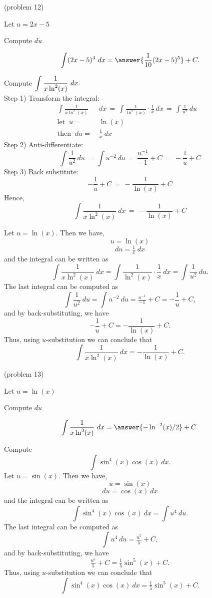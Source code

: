 \documentclass[handout]{ximera}
\begin{document}
\begin{problem}(problem 12)
\begin{hint}
Let $u = 2x - 5$
\end{hint}
\begin{hint}
Compute $du$
\end{hint}
\[\int (2x - 5)^4 \ dx = \answer{\frac{1}{10}(2x-5)^5} +C.\]
\end{problem}


\begin{example}[example 13]
 Compute $\dis \int \frac{1}{x\ln^2(x)} \ dx.$\\
Step 1) Transform the integral:
\begin{align*}
\int \frac{1}{x\ln^2(x)}& \ dx \, = \, \int \frac{1}{\ln^2(x)} \cdot \frac{1}{x} \, dx\,  = \, \int \frac{1}{u^2} \ du\\
\text{let} \;\; u = & \ \ln(x)&  \\
\text{then} \;\; du = & \ \frac{1}{x} \ dx&
\end{align*}
Step 2) Anti-differentiate:
\[
\int \frac{1}{u^2} \, du \, = \, \int u^{-2} \, du\, =\, \frac{u^{-1}}{-1} + C\, =\, -\frac{1}{u} + C
\]
Step 3) Back substitute:
\[
-\frac{1}{u} + C \, =\, -\frac{1}{\ln(x)} + C
\]
Hence,
\[
\int \frac{1}{x\ln^2(x)} \ dx \,= \,-\frac{1}{\ln(x)} + C
\]

Let $u = \ln(x)$. Then we have,
\[u = \ln(x)\]
\[du = \tfrac1x \ dx\]
and the integral can be written as 
\[\int \frac{1}{x\ln^2(x)} \ dx = \int \frac{1}{\ln^2(x)} \cdot \frac{1}{x}\  dx = \int \frac{1}{u^2} \ du.\]
The last integral can be computed as 
\[\int \frac{1}{u^2} \ du = \int u^{-2} \ du = \tfrac{u^{-1}}{-1} + C 
= -\frac{1}{u} + C,\]
and by back-substituting, we have 
\[-\frac{1}{u} + C =  -\frac{1}{\ln(x)} + C.\]
Thus, using $u$-substitution we can conclude that
\[\int \frac{1}{x\ln^2(x)} \ dx =  -\frac{1}{\ln(x)} + C.\]
\end{example}


\begin{problem}(problem 13)
\begin{hint}
Let $u = \ln(x)$
\end{hint}
\begin{hint}
Compute $du$
\end{hint}
\[\int \frac{1}{x\ln^3(x)} \ dx = \answer{- \ln^{-2}(x)/2} +C.\]
\end{problem}

\begin{example}[example 14] Compute 
\[\int \sin^4(x)\cos(x) \ dx.\]
Let $u = \sin(x)$. Then we have,
\[u = \sin(x)\]
\[du = \cos(x) \ dx\]
and the integral can be written as 
\[\int \sin^4(x)\cos(x) \ dx  = \int u^4 \ du.\]
The last integral can be computed as 
\[\int u^4 \ du = \tfrac{u^5}{5} + C,\]
and by back-substituting, we have 
\[\tfrac{u^5}{5} + C = \tfrac15 \sin^5(x) + C.\]
Thus, using $u$-substitution we can conclude that
\[\int \sin^4(x)\cos(x) \ dx =  \tfrac15 \sin^5(x) + C.\]
\end{example}
\end{document}
